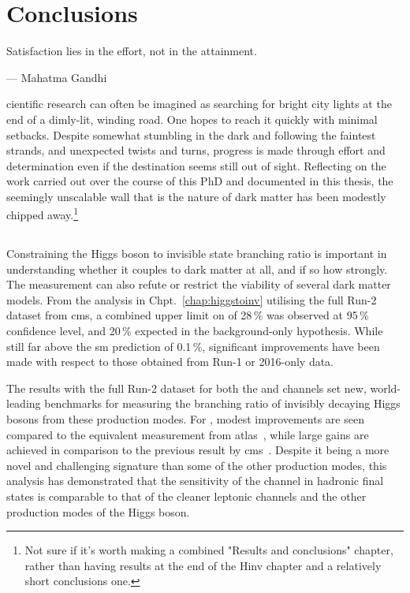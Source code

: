 \chapter{Conclusions}
\label{chap:conclusions}

\epigraph{Satisfaction lies in the effort, not in the attainment.}{--- Mahatma Gandhi}

cientific research can often be imagined as searching for bright city lights at the end of a dimly-lit, winding road. One hopes to reach it quickly with minimal setbacks. Despite somewhat stumbling in the dark and following the faintest strands, and unexpected twists and turns, progress is made through effort and determination even if the destination seems still out of sight. Reflecting on the work carried out over the course of this PhD and documented in this thesis, the seemingly unscalable wall that is the nature of dark matter has been modestly chipped away.\footnote{Not sure if it's worth making a combined "Results and conclusions" chapter, rather than having results at the end of the Hinv chapter and a relatively short conclusions one.}




\section{\texorpdfstring{\higgstoinv}{Higgs to invisible}}
\label{sec:conclusions_htoinv}

Constraining the Higgs boson to invisible state branching ratio is important in understanding whether it couples to dark matter at all, and if so how strongly. The measurement can also refute or restrict the viability of several dark matter models. From the analysis in Chpt.~\ref{chap:higgstoinv} utilising the full Run-2 dataset from \acrshort{cms}, a combined upper limit on \BRHinvFull of 28\,\% was observed at 95\,\% confidence level, and 20\,\% expected in the background-only hypothesis. While still far above the \acrlong{sm} prediction of 0.1\,\%, significant improvements have been made with respect to those obtained from Run-1 or 2016-only data.

The results with the full Run-2 dataset for both the \ttH and \VH channels set new, world-leading benchmarks for measuring the branching ratio of invisibly decaying Higgs bosons from these production modes. For \ttH, modest improvements are seen compared to the equivalent measurement from \acrshort{atlas}~\cite{ATLAS:2020kdi}, while large gains are achieved in comparison to the previous result by \acrshort{cms}~\cite{CMS-PAS-HIG-18-008}. Despite it being a more novel and challenging signature than some of the other production modes, this analysis has demonstrated that the sensitivity of the \ttH channel in hadronic final states is comparable to that of the cleaner leptonic channels and the other production modes of the Higgs boson.

